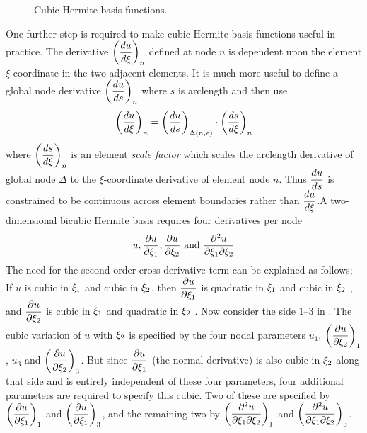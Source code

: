\begin{figure}[htbp] \centering
  
  \caption{Cubic Hermite basis functions.}
  \label{fig:cubic}
\end{figure}

One further step is required to make cubic Hermite basis functions useful in
practice. The derivative $\left(  \dfrac{ d u}{d \xi}  \right)_{n}$ defined at node $n$
is dependent upon the element $\xi$-coordinate in the two adjacent elements.
It is much more useful to define a global node derivative
 $\left(  \dfrac{ d u}{d s}  \right)_{n}$ where $s$ is arclength and then use
\begin{equation}
  \left(  \dfrac{ d u}{d \xi}  \right)_{n}=\left(  \dfrac{ d u}{d s}  \right)_{ \Delta\left( n,e \right) } \cdot
  \left(  \dfrac{ d s}{d \xi}  \right)_{n} 
  \label{eqn:cubichbf}
\end{equation}
where $\left(  \dfrac{ d s}{d \xi}  \right)_{n}$ is an element \emph{scale factor} which scales
the arclength derivative of global node $\Delta$ to the $\xi$-coordinate
derivative of element node $n$. Thus $ \dfrac{ d u}{d s} $ is constrained to be
continuous across element boundaries rather than $ \dfrac{ d u}{d \xi} $.A two-
dimensional bicubic Hermite basis requires four derivatives per node
\begin{equation*}
  u,  \dfrac{\partial u}{\partial \xi_{1}} ,  \dfrac{\partial u}{\partial \xi_{2}}  \text{ and }
   \dfrac{\partial^{2} u}{\partial \xi_{1} \partial \xi_{2}} 
\end{equation*}
The need for the second-order cross-derivative term can be explained as
follows; If $u$ is cubic in $\xi_{1}$ and cubic in $\xi_{2}$, then
$ \dfrac{\partial u}{\partial \xi_{1}} $ is quadratic in $\xi_{1}$ and cubic in $\xi_{2}$ , and
$ \dfrac{\partial u}{\partial \xi_{2}} $ is cubic in $\xi_{1}$ and quadratic in $\xi_{2}$ . Now
consider the side 1--3 in . The cubic variation of $u$
with $\xi_{2}$ is specified by the four nodal parameters $u_{1}$,
$\left(  \dfrac{\partial u}{\partial \xi_{2}}  \right)_{1}$, $u_{3}$ and $\left(  \dfrac{\partial u}{\partial \xi_{2}}  \right)_{3}$.
But since $ \dfrac{\partial u}{\partial \xi_{1}} $ (the normal derivative) is also cubic in
$\xi_{2}$ along that side and is entirely independent of these four parameters,
four additional parameters are required to specify this cubic. Two of these
are specified by $\left(  \dfrac{\partial u}{\partial \xi_{1}}  \right)_{1}$ and
$\left(  \dfrac{\partial u}{\partial \xi_{1}}  \right)_{3}$, and the remaining two by
$\left(  \dfrac{\partial^{2} u}{\partial \xi_{1} \partial \xi_{2}}  \right)_{1}$ and
$\left(  \dfrac{\partial^{2} u}{\partial \xi_{1} \partial \xi_{2}}  \right)_{3}$.

